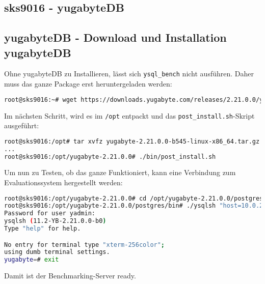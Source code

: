 
\begin{flushleft}
    \section{sks9016 - yugabyteDB}
    \subsection{yugabyteDB - Download und Installation yugabyteDB}
    Ohne yugabyteDB zu Installieren, lässt sich \texttt{ysql\_bench} nicht ausführen.
    Daher muss das ganze Package erst heruntergeladen werden:
    \lstset{style=gra_codestyle}
    \begin{lstlisting}[language=bash, caption=sks9016 - Download yugabyteDB On-Premise,captionpos=b,label={lst:sks9016-yugabytedb-download-on-premise},breaklines=true]
root@sks9016:~# wget https://downloads.yugabyte.com/releases/2.21.0.0/yugabyte-2.21.0.0-b545-linux-x86_64.tar.gz
    \end{lstlisting}
\end{flushleft}
\begin{flushleft}
    Im nächsten Schritt, wird es im \texttt{/opt} entpackt und das \texttt{post\_install.sh}-Skript ausgeführt:
    \lstset{style=gra_codestyle}
    \begin{lstlisting}[language=bash, caption=sks9016 - Installation yugabyteDB On-Premise,captionpos=b,label={lst:sks9016-yugabytedb-install-on-premise},breaklines=true]
root@sks9016:/opt# tar xvfz yugabyte-2.21.0.0-b545-linux-x86_64.tar.gz && cd yugabyte-2.21.0.0/
...
root@sks9016:/opt/yugabyte-2.21.0.0# ./bin/post_install.sh
    \end{lstlisting}
\end{flushleft}
\begin{flushleft}
    Um nun zu Testen, ob das ganze Funktioniert, kann eine Verbindung zum Evaluationssystem hergestellt werden:
    \lstset{style=gra_codestyle}
    \begin{lstlisting}[language=bash, caption=sks9016 - Check yugabyteDB On-Premise,captionpos=b,label={lst:sks9016-yugabytedb-check-on-premise},breaklines=true]
root@sks9016:/opt/yugabyte-2.21.0.0# cd /opt/yugabyte-2.21.0.0/postgres/bin/
root@sks9016:/opt/yugabyte-2.21.0.0/postgres/bin# ./ysqlsh "host=10.0.20.106 user=yadmin"
Password for user yadmin:
ysqlsh (11.2-YB-2.21.0.0-b0)
Type "help" for help.

No entry for terminal type "xterm-256color";
using dumb terminal settings.
yugabyte=# exit
    \end{lstlisting}
    Damit ist der Benchmarking-Server ready.
\end{flushleft}